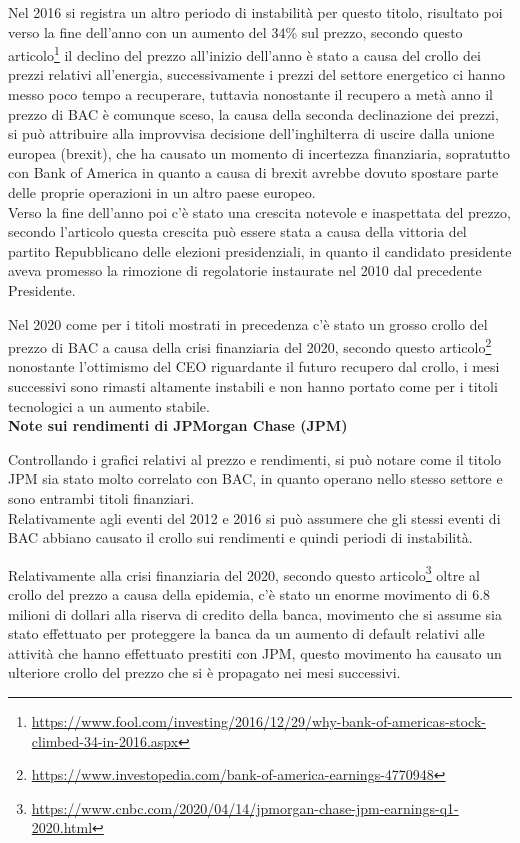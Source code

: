 Nel 2016 si registra un altro periodo di instabilità per questo titolo, risultato poi verso la fine dell'anno con un aumento del 34\% sul prezzo,
secondo questo 
articolo\footnote{
  \href{https://www.fool.com/investing/2016/12/29/why-bank-of-americas-stock-climbed-34-in-2016.aspx}{https://www.fool.com/investing/2016/12/29/why-bank-of-americas-stock-climbed-34-in-2016.aspx}
}
il declino del prezzo all'inizio dell'anno è stato a causa del crollo dei prezzi relativi all'energia,
successivamente i prezzi del settore energetico ci hanno messo poco tempo a recuperare, tuttavia nonostante il recupero a metà anno il prezzo di BAC è comunque sceso,
la causa della seconda declinazione dei prezzi, si può attribuire alla improvvisa decisione dell'inghilterra di uscire dalla unione europea (brexit), che ha causato un momento
di incertezza finanziaria, sopratutto con Bank of America in quanto a causa di brexit avrebbe dovuto spostare parte delle proprie operazioni in un altro paese europeo.\\
Verso la fine dell'anno poi c'è stato una crescita notevole e inaspettata del prezzo, secondo l'articolo questa crescita può essere stata a causa della vittoria del partito
Repubblicano delle elezioni presidenziali, in quanto il candidato presidente aveva promesso la rimozione di regolatorie instaurate nel 2010 dal precedente Presidente.

Nel 2020 come per i titoli mostrati in precedenza c'è stato un grosso crollo del prezzo di BAC a causa della crisi finanziaria del 2020, secondo questo 
articolo\footnote{
  \href{https://www.investopedia.com/bank-of-america-earnings-4770948}{https://www.investopedia.com/bank-of-america-earnings-4770948}
}
nonostante l'ottimismo del CEO riguardante il futuro recupero dal crollo, i mesi successivi sono rimasti altamente instabili e non hanno portato come per i titoli tecnologici
a un aumento stabile.\\

\textbf{Note sui rendimenti di JPMorgan Chase (JPM)}

Controllando i grafici relativi al prezzo e rendimenti, si può notare come il titolo JPM sia stato molto correlato con BAC, in quanto operano nello stesso settore e sono entrambi
titoli finanziari.\\
Relativamente agli eventi del 2012 e 2016 si può assumere che gli stessi eventi di BAC abbiano causato il crollo sui rendimenti e quindi periodi di instabilità.

Relativamente alla crisi finanziaria del 2020, secondo questo
articolo\footnote{
  \href{https://www.cnbc.com/2020/04/14/jpmorgan-chase-jpm-earnings-q1-2020.html}{https://www.cnbc.com/2020/04/14/jpmorgan-chase-jpm-earnings-q1-2020.html}
}
oltre al crollo del prezzo a causa della epidemia, c'è stato un enorme movimento di 6.8 milioni di dollari alla riserva di credito della banca, movimento che si assume sia stato effettuato
per proteggere la banca da un aumento di default relativi alle attività che hanno effettuato prestiti con JPM, questo movimento ha causato un ulteriore crollo del prezzo che si è propagato nei mesi successivi.

